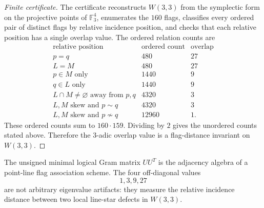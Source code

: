 \begin{proof}[Finite certificate]
The certificate reconstructs $W(3,3)$ from the symplectic form on the projective
points of $\mathbb F_3^4$, enumerates the $160$ flags, classifies every ordered pair
of distinct flags by relative incidence position, and checks that each relative
position has a single overlap value.  The ordered relation counts are
\[
\begin{array}{c|c|c}
\text{relative position} & \text{ordered count} & \text{overlap}\\
\hline
p=q & 480 & 27\\
L=M & 480 & 27\\
p\in M\text{ only} & 1440 & 9\\
q\in L\text{ only} & 1440 & 9\\
L\cap M\ne\varnothing\text{ away from }p,q & 4320 & 3\\
L,M\text{ skew and }p\sim q & 4320 & 3\\
L,M\text{ skew and }p\not\sim q & 12960 & 1.
\end{array}
\]
These ordered counts sum to $160\cdot159$.  Dividing by $2$ gives the unordered
counts stated above.  Therefore the $3$-adic overlap value is a flag-distance
invariant on $W(3,3)$.
\end{proof}

\begin{corollary}
The unsigned minimal logical Gram matrix $UU^T$ is the adjacency algebra of a
point-line flag association scheme.  The four off-diagonal values
\[
        1,3,9,27
\]
are not arbitrary eigenvalue artifacts: they measure the relative incidence distance
between two local line-star defects in $W(3,3)$.
\end{corollary}
